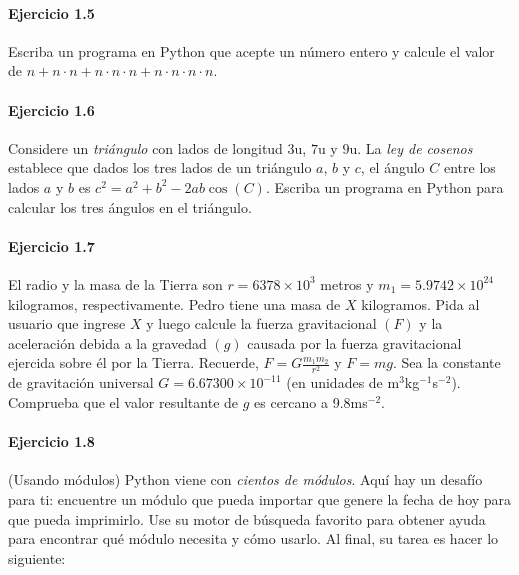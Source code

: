 \paragraph{\color{DarkBlue}Ejercicio 1.5}
Escriba un programa en Python que acepte un número entero y calcule
el valor de
\begin{math}
	n +
	n\cdot n +
	n\cdot n\cdot n +
	n\cdot n\cdot n\cdot n
\end{math}.

\paragraph{\color{DarkBlue}Ejercicio 1.6}
Considere un \emph{triángulo} con lados de longitud $3$u, $7$u y
$9$u.
La \emph{ley de cosenos} establece que dados los tres lados de un
triángulo $a$, $b$ y $c$, el ángulo $C$ entre los lados $a$ y $b$ es
\begin{math}
	c^{2}=
	a^{2}+
	b^{2}-
	2ab\cos\left(C\right)
\end{math}.
Escriba un programa en Python para calcular los tres ángulos en el
triángulo.

\paragraph{\color{DarkBlue}Ejercicio 1.7}
El radio y la masa de la Tierra son
\begin{math}
	r =
	6378\times10^{3}
\end{math}
metros y
\begin{math}
	m_{1}=
	5.9742\times10^{24}
\end{math}
kilogramos, respectivamente.
Pedro tiene una masa de $X$ kilogramos.
Pida al usuario que ingrese $X$ y luego calcule la fuerza
gravitacional $\left(F\right)$ y la aceleración debida a la gravedad
$\left(g\right)$ causada por la fuerza gravitacional ejercida sobre
él por la Tierra.
Recuerde, $F=G\frac{m_{1}m_{2}}{r^{2}}$ y $F=mg$.
Sea la constante de gravitación universal $G=6.67300\times 10^{-11}$
(en unidades de m$^{3}$kg$^{-1}$s$^{-2}$).
Comprueba que el valor resultante de $g$ es cercano a 9.8ms$^{-2}$.

\paragraph{\color{DarkBlue}Ejercicio 1.8}
(Usando módulos) Python viene con \emph{cientos de módulos}.
Aquí hay un desafío para ti: encuentre un módulo que pueda importar
que genere la fecha de hoy para que pueda imprimirlo.
Use su motor de búsqueda favorito para obtener ayuda para encontrar
qué módulo necesita y cómo usarlo.
Al final, su tarea es hacer lo siguiente:
\begin{listing}[ht!]
	\inputminted{python}{1.8.py}
\end{listing}

